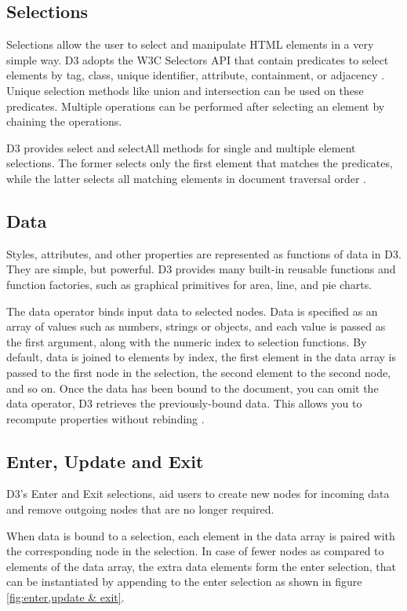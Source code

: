 \documentclass[9pt,twocolumn,twoside]{../../styles/osajnl}
\begin{document}
\subsection{Selections}
Selections allow the user to select and manipulate HTML elements in a very simple way. D3 adopts the W3C Selectors API \cite{www-w3c} that contain predicates to select elements by tag, class, unique identifier, attribute, containment, or adjacency \cite{www-d3}. Unique selection methods like union and intersection can be used on these predicates. Multiple operations can be performed after selecting an element by chaining the operations. 

D3 provides select and selectAll methods for single and multiple element selections. The former selects only the first element that matches the predicates, while the latter selects all matching elements in document traversal order \cite{paper-d3}.

   
    
\subsection{Data}
Styles, attributes, and other properties are represented as functions of data in D3. They are simple, but powerful. D3 provides many built-in reusable functions and function factories, such as graphical primitives for area, line, and pie charts.

The data operator binds input data to selected nodes. Data is specified as an array of values such as numbers, strings or objects, and each value is passed as the first argument, along with the numeric index to selection functions. By default, data is joined to elements by index, the first element in the data array is passed to the first node in the selection, the second element to the second node, and so on. Once the data has been bound to the document, you can omit the data operator, D3 retrieves the previously-bound data. This allows you to recompute properties without rebinding \cite{www-d3}.

   
    
\subsection{Enter, Update and Exit}
D3’s Enter and Exit selections, aid users to create new nodes for incoming data and remove outgoing nodes that are no longer required.

When data is bound to a selection, each element in the data array is paired with the corresponding node in the selection. In case of fewer nodes as compared to elements of the data array, the extra data elements form the enter selection, that can be instantiated by appending to the enter selection as shown in figure \ref{fig:enter,update & exit}. 
\end{document}
